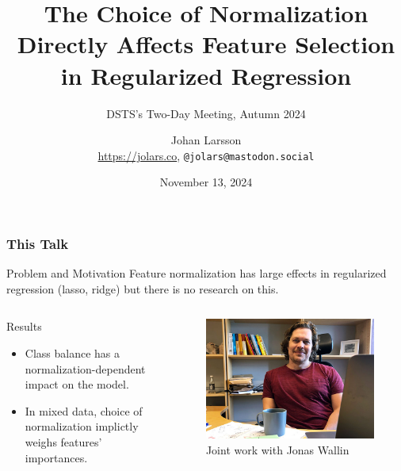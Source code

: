 \documentclass[aspectratio=1610,onlytextwidth]{beamer}
\title{The Choice of Normalization Directly Affects Feature Selection in Regularized Regression}
\subtitle{DSTS's Two-Day Meeting, Autumn 2024}
\author{Johan Larsson\\\smallskip\scriptsize \url{https://jolars.co}, {\texttt{@jolars@mastodon.social}}}
\institute{Department of Mathematical Sciences, Copenhagen University}
\date{November 13, 2024}
\begin{document}
\maketitle

\begin{frame}[c]
  \frametitle{This Talk}

  \begin{alertblock}{Problem and Motivation}
    Feature normalization has large effects in regularized regression (lasso, ridge)
    but there is no research on this.
  \end{alertblock}

  \pause

  \begin{columns}[T]
    \begin{column}{0.55\textwidth}
      \begin{exampleblock}{Results}
        \begin{itemize}
          \item Class balance has a normalization-dependent impact on the model.
          \item In mixed data, choice of normalization implictly weighs features' importances.
        \end{itemize}
      \end{exampleblock}

    \end{column}
    \begin{column}{0.4\textwidth}
      \begin{figure}
        \includegraphics[width=\textwidth]{figures/jonas.jpg}
        \caption{Joint work with Jonas Wallin}
      \end{figure}
    \end{column}
  \end{columns}

\end{frame}
\end{document}
